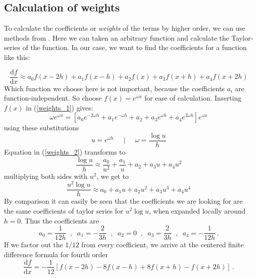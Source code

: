 \subsection{Calculation of weights} \label{weight_section}
To calculate the coefficients or \textit{weights} of the terms by higher order, we can use methods from \cite{Fornberg1998}.  Here we can taken an arbitrary function and calculate the Taylor-series of the function. In our case, we want to find the coefficients for a function like this:

\begin{equation}
    \frac{\mathrm{d}f}{\mathrm{d}x} \approx a_0 f(x-2h) + a_1 f(x-h) + a_2 f(x) + a_3 f(x+h) + a_4 f(x+2h) \label{weights_1}
\end{equation}
Which function we choose here is not important, because the coefficients $a_i$ are function-independent. So choose $f(x) = e^{\omega x}$ for ease of calculation. Inserting $f(x)$ in (\ref{weights_1}) gives:
\begin{equation}
    \omega e^{\omega x} = \left[a_0 e^{-2\omega h}+ a_1 e^{-\omega h} +a_2 +a_3 e^{\omega h}+a_4 e^{2\omega h} \right] e^{\omega x} \label{weights_2}
\end{equation}
using these substitutions
\begin{equation}
    u = e^{\omega h } \;\;\;\;\;|\;\;\;\;\; \omega = \frac{\log u}{h}
\end{equation}
Equation in (\ref{weights_2}) transforms to
\begin{equation}\label{weights-mid}
    \frac{\log u }{h} \approx \frac{a_0}{u^2} + \frac{a_1}{u} + a_2 + a_3 u + a_4 u^2
\end{equation}
multiplying both sides with $u^2$, we get to
\begin{equation}
    \frac{u^2 \log u}{h} \approx a_0 + a_1 u + a_2 u^2 + a_3 u^3 + a_4 u^4
\end{equation}
By comparison it can easily be seen that the coefficients we are looking for are the same coefficients of taylor series for $u^2 \log u $, when expanded locally around $h=0$. Thus the coefficients are
\begin{equation}
    a_0 =\frac{1}{12h}\;\;,\;\;a_1 = -\frac{2}{3h} \;\;,\;\;a_2 =0 \;\;,\;\;a_3 = \frac{2}{3h}\;\;,\;\;a_4 =-\frac{1}{12h} \, .
\end{equation}
If we factor out the $1/12$ from every coefficient, we arrive at the centered finite difference formula for fourth order
\begin{equation}
    \frac{\mathrm{d}f}{\mathrm{d}x} =-\frac{1}{12} \left[ f(x-2h) -8  f(x-h) + 8 f(x+h) - f(x+2h) \right] \label{coeff_fourth} \, .
\end{equation}
